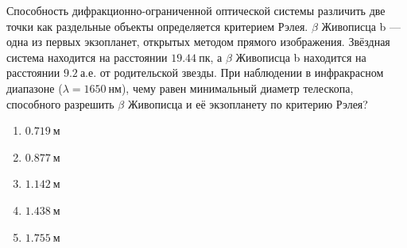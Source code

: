 Способность дифракционно-ограниченной оптической системы
различить две точки как раздельные объекты определяется критерием Рэлея.
$\beta$ Живописца b — одна из первых экзопланет, открытых методом прямого
изображения. Звёздная система находится на расстоянии $\qty{19.44}{пк}$, а
$\beta$ Живописца b находится на расстоянии $\qty{9.2}{а.е.}$ от родительской
звезды. При наблюдении в инфракрасном диапазоне ($\lambda = \qty{1650}{нм}$),
чему равен минимальный диаметр телескопа, способного разрешить
$\beta$ Живописца и её экзопланету по критерию Рэлея?

\begin{enumerate}[label=\alph*)]
  \item $\qty{0.719}{м}$
  \item $\qty{0.877}{м}$
  \item $\qty{1.142}{м}$
  \item $\qty{1.438}{м}$
  \item $\qty{1.755}{м}$
\end{enumerate}

